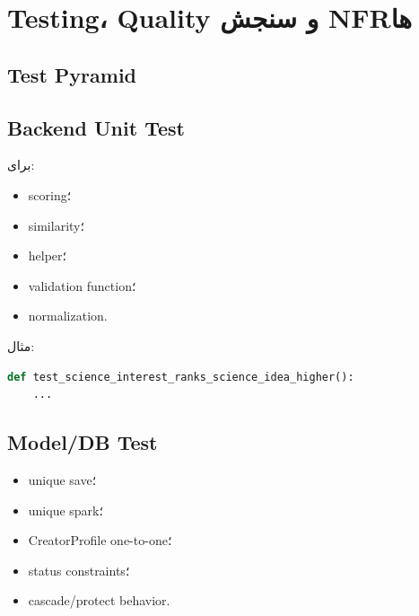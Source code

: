 
\chapter{Testing، Quality و سنجش NFRها}

\section{Test Pyramid}

\begin{center}
\end{center}

\section{Backend Unit Test}

برای:
\begin{itemize}
  \item scoring؛
  \item similarity؛
  \item helper؛
  \item validation function؛
  \item normalization.
\end{itemize}

مثال:
\begin{latin}
\begin{lstlisting}[language=Python]
def test_science_interest_ranks_science_idea_higher():
    ...
\end{lstlisting}
\end{latin}

\section{Model/DB Test}

\begin{itemize}
  \item unique save؛
  \item unique spark؛
  \item CreatorProfile one-to-one؛
  \item status constraints؛
  \item cascade/protect behavior.
\end{itemize}

